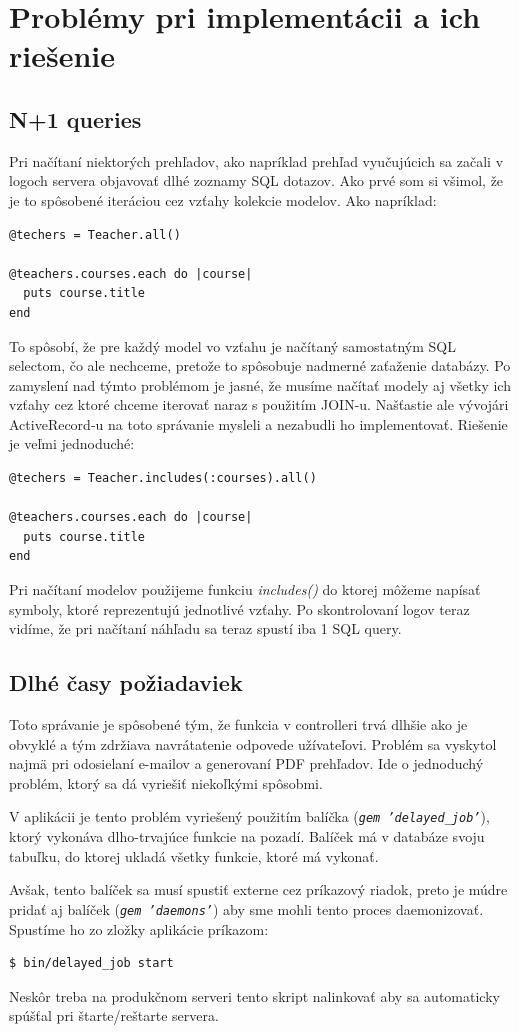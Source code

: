 \section{Problémy pri implementácii a ich riešenie}
\subsection{N+1 queries}

Pri načítaní niektorých prehľadov, ako napríklad prehľad vyučujúcich sa začali v logoch servera objavovať dlhé zoznamy SQL dotazov. Ako prvé som si všimol, že je to spôsobené iteráciou cez vzťahy kolekcie modelov. Ako napríklad:

\begin{verbatim}
@techers = Teacher.all()

@teachers.courses.each do |course|
  puts course.title
end
\end{verbatim}

To spôsobí, že pre každý model vo vzťahu je načítaný samostatným SQL selectom, čo ale nechceme, pretože to spôsobuje nadmerné zaťaženie databázy. Po zamyslení nad týmto problémom je jasné, že musíme načítať modely aj všetky ich vzťahy cez ktoré chceme iterovať naraz s použitím JOIN-u.
Našťastie ale vývojári ActiveRecord-u na toto správanie mysleli a nezabudli ho implementovať. Riešenie je veľmi jednoduché:

\begin{verbatim}
@techers = Teacher.includes(:courses).all()

@teachers.courses.each do |course|
  puts course.title
end
\end{verbatim}

Pri načítaní modelov použijeme funkciu \emph{includes()} do ktorej môžeme napísať symboly, ktoré reprezentujú jednotlivé vzťahy. Po skontrolovaní logov teraz vidíme, že pri načítaní náhľadu sa teraz spustí iba 1 SQL query.

\subsection{Dlhé časy požiadaviek}

Toto správanie je spôsobené tým, že funkcia v controlleri trvá dlhšie ako je obvyklé a tým zdržiava navrátatenie odpovede užívateľovi.
Problém sa vyskytol najmä pri odosielaní e-mailov a generovaní PDF prehľadov. Ide o jednoduchý problém, ktorý sa dá vyriešiť niekoľkými spôsobmi. 

V aplikácii je tento problém vyriešený použitím balíčka (\emph{\texttt{gem 'delayed\_job'}}), ktorý vykonáva dlho-trvajúce funkcie na pozadí. Balíček má v databáze svoju tabuľku, do ktorej ukladá všetky funkcie, ktoré má vykonať. 

Avšak, tento balíček sa musí spustiť externe cez príkazový riadok, preto je múdre pridať aj balíček (\emph{\texttt{gem 'daemons'}}) aby sme mohli tento proces daemonizovať. Spustíme ho zo zložky aplikácie príkazom:

\begin{verbatim}
$ bin/delayed_job start
\end{verbatim}

Neskôr treba na produkčnom serveri tento skript nalinkovať aby sa automaticky spúšťal pri štarte/reštarte servera.